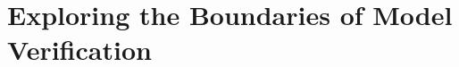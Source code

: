 \chapter{Exploring the Boundaries of Model Verification}
\label{chap:exploring-boundaries}















 